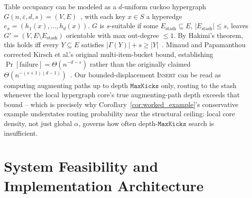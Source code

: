 \documentclass[conference]{IEEEtran}
\let\oldtextsc\textsc
\renewcommand{\textsc}[1]{\textup{\oldtextsc{#1}}}
\begin{document}
	Table occupancy can be modeled as a $d$-uniform cuckoo hypergraph
	$G(n,\varepsilon,d,s)=(V,E)$~\cite{minaud2023generalized}, with each key
	$x\in S$ a hyperedge $e_x=(h_1(x),\dots,h_d(x))$. $G$ is $s$-suitable if
	some $E_{\text{stash}}\subseteq E$, $|E_{\text{stash}}|\le s$, leaves
	$G'=(V,E\setminus E_{\text{stash}})$ orientable with max out-degree
	$\le 1$. By Hakimi's theorem, this holds iff every $Y\subseteq E$
	satisfies $|\Gamma(Y)|+s\ge|Y|$~\cite{minaud2023generalized}. Minaud and
	Papamanthou corrected Kirsch et al.'s original multi-item-bucket bound,
	establishing $\Pr[\text{failure}]=\Theta(n^{-d-s})$ rather than the
	originally claimed $\Theta(n^{-(s+1)(d-1)})$~\cite{kirsch2009stash,minaud2023generalized}.
	Our bounded-displacement \textsc{Insert} can be read as computing
	augmenting paths up to depth $\mathtt{MaxKicks}$ only, routing to the
	stash whenever the local hypergraph core's true augmenting-path depth
	exceeds that bound -- which is precisely why
	Corollary~\ref{cor:worked_example}'s conservative example understates
	routing probability near the structural ceiling: local core density,
	not just global $\alpha$, governs how often depth-$\mathtt{MaxKicks}$
	search is insufficient.
	
	\section{System Feasibility and Implementation Architecture}
	\label{sec:feasibility}
	
\end{document}
